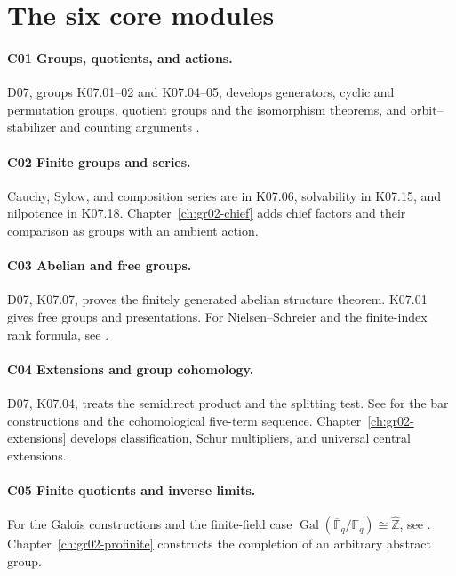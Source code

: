 \documentclass[11pt,oneside,openany]{book}
\theoremstyle{definition}
\theoremstyle{remark}
\begin{document}
\section*{The six core modules}

\paragraph{C01 \enspace Groups, quotients, and actions.}
D07, groups K07.01--02 and K07.04--05, develops generators, cyclic
and permutation groups, quotient groups and the isomorphism theorems,
and orbit--stabilizer and counting arguments \cite{d07}.

\paragraph{C02 \enspace Finite groups and series.}
Cauchy, Sylow, and composition series are in K07.06, solvability
in K07.15, and nilpotence in K07.18. Chapter~\ref{ch:gr02-chief} adds
chief factors and their comparison as groups with an ambient action.

\paragraph{C03 \enspace Abelian and free groups.}
D07, K07.07, proves the finitely generated abelian structure theorem.
K07.01 gives free groups and presentations. For Nielsen--Schreier
and the finite-index rank formula, see \cite[Results B04--B05]{geomgroup}.

\paragraph{C04 \enspace Extensions and group cohomology.}
D07, K07.04, treats the semidirect product and the splitting test.
See \cite[Results A02--A03, A05, and A10]{homalg} for the bar
constructions and the cohomological five-term sequence.
Chapter~\ref{ch:gr02-extensions} develops classification,
Schur multipliers, and universal central extensions.

\paragraph{C05 \enspace Finite quotients and inverse limits.}
For the Galois constructions and the finite-field case
\(\operatorname{Gal}(\overline{\mathbb F}_q/\mathbb F_q)
\cong\widehat{\mathbb Z}\), see \cite[Results T04--T06 and E06]{field}.
Chapter~\ref{ch:gr02-profinite} constructs the completion of an
arbitrary abstract group.
\end{document}

